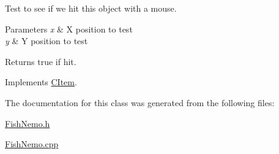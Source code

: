 Test to see if we hit this object with a mouse. 
\begin{DoxyParams}{Parameters}
{\em x} & X position to test \\
\hline
{\em y} & Y position to test \\
\hline
\end{DoxyParams}
\begin{DoxyReturn}{Returns}
true if hit. 
\end{DoxyReturn}


Implements \hyperlink{class_c_item_a8bd4f5e3f2eb2487125dd435719484e8}{C\+Item}.



The documentation for this class was generated from the following files\+:\begin{DoxyCompactItemize}
\item 
\hyperlink{_fish_nemo_8h}{Fish\+Nemo.\+h}\item 
\hyperlink{_fish_nemo_8cpp}{Fish\+Nemo.\+cpp}\end{DoxyCompactItemize}
